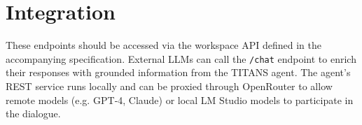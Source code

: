 \documentclass[letterpaper,twocolumn]{article}
\begin{document}
\section{Integration}

These endpoints should be accessed via the workspace API defined in the accompanying specification.  External LLMs can call the \texttt{/chat} endpoint to enrich their responses with grounded information from the TITANS agent.  The agent’s REST service runs locally and can be proxied through OpenRouter to allow remote models (e.g. GPT‑4, Claude) or local LM Studio models to participate in the dialogue.
\end{document}
